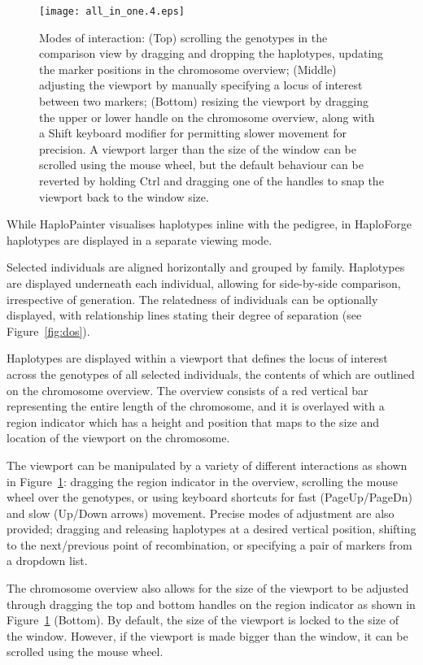 \documentclass{bioinfo}
\numberwithin{equation}{section}
\def\haplo{{HaploForge}}
\def\hpainter{{HaploPainter}}
\begin{document}
\begin{figure}[!tpb]
	\centerline{\texttt{[image: all\_in\_one.4.eps]}}\caption{Modes of interaction: (Top) scrolling the genotypes in the comparison view by dragging and dropping the haplotypes, updating the marker positions in the chromosome overview; (Middle) adjusting the viewport by manually specifying a locus of interest between two markers; (Bottom) resizing the viewport by dragging the upper or lower handle on the chromosome overview, along with a Shift keyboard modifier for permitting slower movement for precision. A viewport larger than the size of the window can be scrolled using the mouse wheel, but the default behaviour can be reverted by holding Ctrl and dragging one of the handles to snap the viewport back to the window size.}\label{fig:viewportmanip}
\end{figure}	

		
While \hpainter{} visualises haplotypes inline with the pedigree, in \haplo{} haplotypes are displayed in a separate viewing mode.

Selected individuals are aligned horizontally and grouped by family. Haplotypes are displayed underneath each individual, allowing for side-by-side comparison, irrespective of generation. The relatedness of individuals can be optionally displayed, with relationship lines stating their degree of separation (see Figure~\ref{fig:dos}). 

Haplotypes are displayed within a viewport that defines the locus of interest across the genotypes of all selected individuals, the contents of which are outlined on the chromosome overview. The overview consists of a red vertical bar representing the entire length of the chromosome, and it is overlayed with a region indicator which has a height and position that maps to the size and location of the viewport on the chromosome.

\pagebreak
The viewport can be manipulated by a variety of different interactions as shown in Figure~\ref{fig:viewportmanip}: dragging the region indicator in the overview, scrolling the mouse wheel over the genotypes, or using keyboard shortcuts for fast (PageUp/PageDn) and slow (Up/Down arrows) movement. Precise modes of adjustment are also provided; dragging and releasing haplotypes at a desired vertical position, shifting to the next/previous point of recombination, or specifying a pair of markers from a dropdown list.

The chromosome overview also allows for the size of the viewport to be adjusted through dragging the top and bottom handles on the region indicator as shown in Figure~\ref{fig:viewportmanip} (Bottom). By default, the size of the viewport is locked to the size of the window. However, if the viewport is made bigger than the window, it can be scrolled using the mouse wheel.
\end{document}
